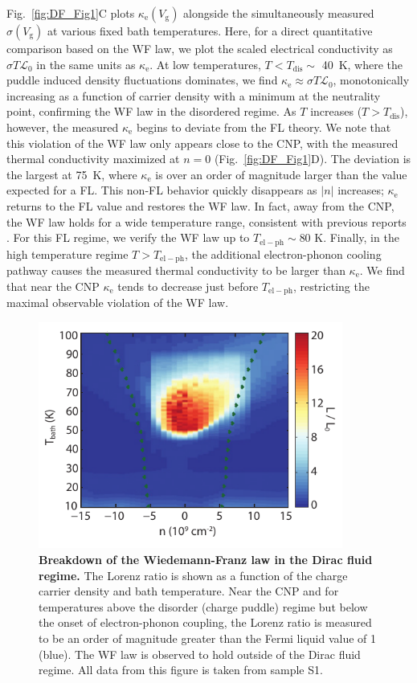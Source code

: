 Fig.~\ref{fig:DF_Fig1}C plots $\kappa_{\mathrm{e}}(V_{\mathrm{g}})$ alongside the simultaneously measured $\sigma(V_{\mathrm{g}})$ at various fixed bath temperatures. Here, for a direct quantitative comparison based on the WF law, we plot the scaled electrical conductivity as $\sigma T\mathcal{L}_0$ in the same units as $\kappa_{\mathrm{e}}$. At low temperatures, $T<T_{\mathrm{dis}}\sim$ 40~K, where the puddle induced density fluctuations dominates, we find $\kappa_{\mathrm{e}}\approx\sigma T\mathcal{L}_0$, monotonically increasing as a function of carrier density with a minimum at the neutrality point, confirming the WF law in the disordered regime. As $T$ increases ($T>T_{\mathrm{dis}}$), however, the measured $\kappa_{\mathrm{e}}$ begins to deviate from the FL theory. We note that this violation of the WF law only appears close to the CNP, with the measured thermal conductivity maximized at $n=0$ (Fig.~\ref{fig:DF_Fig1}D).
The deviation is the largest at  75~K, where $\kappa_{\mathrm{e}}$ is over an order of magnitude larger than the value expected for a FL.   This non-FL behavior quickly disappears as $|n|$ increases; $\kappa_{\mathrm{e}}$ returns to the FL value and restores the WF law.   In fact, away from the CNP, the WF law holds for a wide temperature range, consistent with previous reports \cite{crossno_development_2015, yigen_wiedemannfranz_2014, fong_measurement_2013}.    For this FL regime, we verify the WF law up to $T_{\mathrm{el-ph}} \sim 80$ K.  Finally, in the high temperature regime $T>T_{\mathrm{el-ph}}$, the additional electron-phonon cooling pathway causes the measured thermal conductivity to be larger than $\kappa_{\mathrm{e}}$.  We find that near the CNP $\kappa_{\mathrm{e}}$ tends to decrease just before $T_{\mathrm{el-ph}}$, restricting the maximal observable violation of the WF law.

\begin{figure}
\centering
\includegraphics[width=100mm]{figures/Dirac_fluid/Fig2.pdf}
\caption{\textbf{Breakdown of the Wiedemann-Franz law in the Dirac fluid regime.} The Lorenz ratio is shown as a function of the charge carrier density and bath temperature. Near the CNP and for temperatures above the disorder (charge puddle) regime but below the onset of electron-phonon coupling, the Lorenz ratio is measured to be an order of magnitude greater than the Fermi liquid value of 1 (blue). The WF law is observed to hold outside of the Dirac fluid regime.  All data from this figure is taken from sample S1.}
\label{fig:DF_Fig2}
\end{figure}

